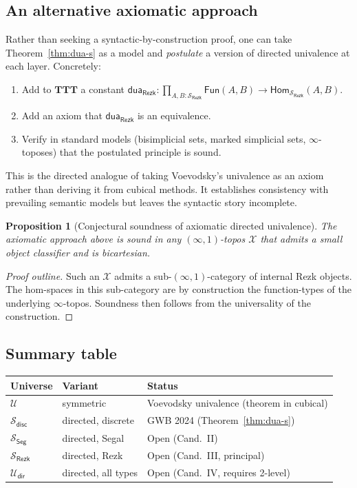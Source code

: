 \documentclass[12pt]{article}
\newtheorem{proposition}[theorem]{Proposition}
\theoremstyle{definition}
\theoremstyle{remark}
\newcommand{\U}{\mathcal{U}}
\newcommand{\Hom}{\mathsf{Hom}}
\newcommand{\Fun}{\mathsf{Fun}}
\newcommand{\dua}{\mathsf{dua}}
\newcommand{\disc}{\mathsf{disc}}
\newcommand{\TTT}{\mathbf{TTT}}
\begin{document}
\subsection{An alternative axiomatic approach}

Rather than seeking a syntactic-by-construction proof, one can take Theorem~\ref{thm:dua-s} as a model and \emph{postulate} a version of directed univalence at each layer. Concretely:

\begin{enumerate}
\item Add to $\TTT$ a constant $\dua_{\mathsf{Rezk}} : \prod_{A,B : \mathcal{S}_{\mathsf{Rezk}}} \Fun(A, B) \to \Hom_{\mathcal{S}_{\mathsf{Rezk}}}(A,B)$.
\item Add an axiom that $\dua_{\mathsf{Rezk}}$ is an equivalence.
\item Verify in standard models (bisimplicial sets, marked simplicial sets, $\infty$-toposes) that the postulated principle is sound.
\end{enumerate}

This is the directed analogue of taking Voevodsky's univalence as an axiom rather than deriving it from cubical methods. It establishes consistency with prevailing semantic models but leaves the syntactic story incomplete.

\begin{proposition}[Conjectural soundness of axiomatic directed univalence]\label{prop:axiomatic-sound}
The axiomatic approach above is sound in any $(\infty,1)$-topos $\mathcal{X}$ that admits a small object classifier and is bicartesian.
\end{proposition}

\begin{proof}[Proof outline]
Such an $\mathcal{X}$ admits a sub-$(\infty,1)$-category of internal Rezk objects. The hom-spaces in this sub-category are by construction the function-types of the underlying $\infty$-topos. Soundness then follows from the universality of the construction.
\end{proof}

\subsection{Summary table}

\begin{center}
\begin{tabular}{lll}
\toprule
\textbf{Universe} & \textbf{Variant} & \textbf{Status} \\
\midrule
$\U$ & symmetric & Voevodsky univalence (theorem in cubical) \\
$\mathcal{S}_{\disc}$ & directed, discrete & GWB 2024 (Theorem~\ref{thm:dua-s}) \\
$\mathcal{S}_{\mathsf{Seg}}$ & directed, Segal & Open (Cand.\ II) \\
$\mathcal{S}_{\mathsf{Rezk}}$ & directed, Rezk & Open (Cand.\ III, principal) \\
$\U_{\mathsf{dir}}$ & directed, all types & Open (Cand.\ IV, requires 2-level) \\
\bottomrule
\end{tabular}
\end{center}
\end{document}
